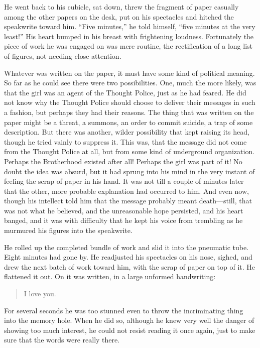 He went back to his cubicle, sat down, threw the fragment of paper
casually among the other papers on the desk, put on his spectacles and
hitched the speakwrite toward him. ``Five minutes,'' he told himself,
``five minutes at the very least!'' His heart bumped in his breast with
frightening loudness. Fortunately the piece of work he was engaged on
was mere routine, the rectification of a long list of figures, not
needing close attention.

Whatever was written on the paper, it must have some kind of political
meaning. So far as he could see there were two possibilities. One, much
the more likely, was that the girl was an agent of the Thought Police,
just as he had feared. He did not know why the Thought Police should
choose to deliver their messages in such a fashion, but perhaps they had
their reasons. The thing that was written on the paper might be a
threat, a summons, an order to commit suicide, a trap of some
description. But there was another, wilder possibility that kept raising
its head, though he tried vainly to suppress it. This was, that the
message did not come from the Thought Police at all, but from some kind
of underground organization. Perhaps the Brotherhood existed after all!
Perhaps the girl was part of it! No doubt the idea was absurd, but it
had sprung into his mind in the very instant of feeling the scrap of
paper in his hand. It was not till a couple of minutes later that the
other, more probable explanation had occurred to him. And even now,
though his intellect told him that the message probably meant
death---still, that was not what he believed, and the unreasonable hope
persisted, and his heart banged, and it was with difficulty that he kept
his voice from trembling as he murmured his figures into the speakwrite.

He rolled up the completed bundle of work and slid it into the pneumatic
tube. Eight minutes had gone by. He readjusted his spectacles on his
nose, sighed, and drew the next batch of work toward him, with the scrap
of paper on top of it. He flattened it out. On it was written, in a
large unformed handwriting:

\begin{quotation}
I love you.
\end{quotation}


For several seconds he was too stunned even to throw the incriminating
thing into the memory hole. When he did so, although he knew very well
the danger of showing too much interest, he could not resist reading it
once again, just to make sure that the words were really there.

